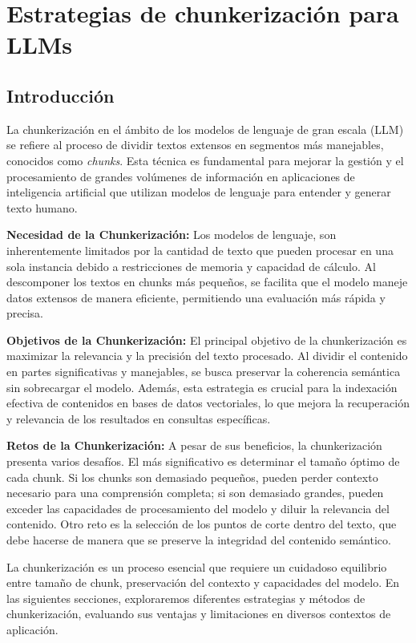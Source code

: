 
\cleardoublepage

\chapter{Estrategias de chunkerización para LLMs}
\label{Estrategias de chunkerización}

\section{Introducción}
La chunkerización en el ámbito de los modelos de lenguaje de gran escala (LLM) se refiere al proceso de dividir textos extensos en segmentos más manejables, conocidos como \textit{chunks}. Esta técnica es fundamental para mejorar la gestión y el procesamiento de grandes volúmenes de información en aplicaciones de inteligencia artificial que utilizan modelos de lenguaje para entender y generar texto humano.

\textbf{Necesidad de la Chunkerización:} Los modelos de lenguaje, son inherentemente limitados por la cantidad de texto que pueden procesar en una sola instancia debido a restricciones de memoria y capacidad de cálculo. Al descomponer los textos en chunks más pequeños, se facilita que el modelo maneje datos extensos de manera eficiente, permitiendo una evaluación más rápida y precisa.

\textbf{Objetivos de la Chunkerización:} El principal objetivo de la chunkerización es maximizar la relevancia y la precisión del texto procesado. Al dividir el contenido en partes significativas y manejables, se busca preservar la coherencia semántica sin sobrecargar el modelo. Además, esta estrategia es crucial para la indexación efectiva de contenidos en bases de datos vectoriales, lo que mejora la recuperación y relevancia de los resultados en consultas específicas.

\textbf{Retos de la Chunkerización:} A pesar de sus beneficios, la chunkerización presenta varios desafíos. El más significativo es determinar el tamaño óptimo de cada chunk. Si los chunks son demasiado pequeños, pueden perder contexto necesario para una comprensión completa; si son demasiado grandes, pueden exceder las capacidades de procesamiento del modelo y diluir la relevancia del contenido. Otro reto es la selección de los puntos de corte dentro del texto, que debe hacerse de manera que se preserve la integridad del contenido semántico.

La chunkerización es un proceso esencial que requiere un cuidadoso equilibrio entre tamaño de chunk, preservación del contexto y capacidades del modelo. En las siguientes secciones, exploraremos diferentes estrategias y métodos de chunkerización, evaluando sus ventajas y limitaciones en diversos contextos de aplicación.

